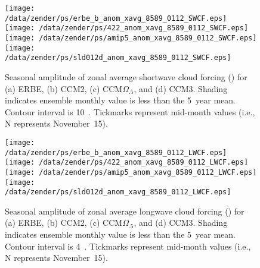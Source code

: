 \documentclass[twocolumn,final,11pt]{article}
\begin{document}
\begin{figure}
\begin{center}
\texttt{[image: /data/zender/ps/erbe\_b\_anom\_xavg\_8589\_0112\_SWCF.eps]}\vfill
\texttt{[image: /data/zender/ps/422\_anom\_xavg\_8589\_0112\_SWCF.eps]}\vfill
\texttt{[image: /data/zender/ps/amip5\_anom\_xavg\_8589\_0112\_SWCF.eps]}\vfill
\texttt{[image: /data/zender/ps/sld012d\_anom\_xavg\_8589\_0112\_SWCF.eps]}\vfill
\end{center}
\caption[Seasonal amplitude of zonal average shortwave cloud forcing
SWCF for ERBE, CCM2, CCM$\Omega_{.5}$, and CCM3]{
Seasonal amplitude of zonal average shortwave cloud 
forcing (\wxmS) for (a) ERBE, (b) CCM2, (c) CCM$\Omega_{.5}$, and (d)
CCM3.  
Shading indicates ensemble monthly value is less than the 5~year
mean. 
Contour interval is 10~\wxmS.
Tickmarks represent mid-month values (i.e., N represents
November~15). 
\label{fig:anom_xavg_8589_0112_SWCF}}   
\end{figure}

\begin{figure}
\begin{center}
\texttt{[image: /data/zender/ps/erbe\_b\_anom\_xavg\_8589\_0112\_LWCF.eps]}\vfill
\texttt{[image: /data/zender/ps/422\_anom\_xavg\_8589\_0112\_LWCF.eps]}\vfill
\texttt{[image: /data/zender/ps/amip5\_anom\_xavg\_8589\_0112\_LWCF.eps]}\vfill
\texttt{[image: /data/zender/ps/sld012d\_anom\_xavg\_8589\_0112\_LWCF.eps]}\vfill
\end{center}
\caption[Seasonal amplitude of zonal average longwave cloud forcing 
LWCF for ERBE, CCM2, CCM$\Omega_{.5}$, and CCM3]{
Seasonal amplitude of zonal average longwave cloud 
forcing (\wxmS) for (a) ERBE, (b) CCM2, (c) CCM$\Omega_{.5}$, and (d)
CCM3.  
Shading indicates ensemble monthly value is less than the 5~year
mean. 
Contour interval is 4~\wxmS.
Tickmarks represent mid-month values (i.e., N represents
November~15). 
\label{fig:anom_xavg_8589_0112_LWCF}}   
\end{figure}
\clearpage
\end{document}
